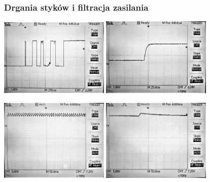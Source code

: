 \begin{frame}
\frametitle{Drgania styków i filtracja zasilania} 
\begin{center}
	\includegraphics[width=0.39\textwidth]{rys/drganiaPrzyciskow.jpg}
	\includegraphics[width=0.39\textwidth]{rys/drganiaStykowFiltr.jpg}
\end{center} 
\begin{center}
\includegraphics[width=0.39\textwidth]{rys/zasilanie.jpg} 
\includegraphics[width=0.39\textwidth]{rys/zasilanieFiltr.jpg}
\end{center}
\end{frame}

